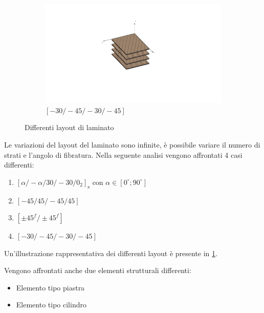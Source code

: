 \documentclass[a4paper,num-refs]{oup-contemporary}
\begin{document}
\begin{figure}[bt!]
\begin{subfigure}[t]{0.24\textwidth}
	\end{subfigure}
	\hfill
	\begin{subfigure}[t]{0.24\textwidth}
		\centering
		\includegraphics[width=\textwidth]{struct4.pdf}
		\caption{$[-30 /-45 /-30 /-45]$}
		
	\end{subfigure}
	\hfill
	\caption{Differenti layout di laminato }
	\label{fig:laminates}
\end{figure}

Le variazioni del layout del laminato sono infinite, è possibile variare il numero di strati e l'angolo di fibratura. Nella seguente analisi vengono affrontati 4 casi differenti:

\begin{enumerate}[label=(\alph*)]
	\item $[\alpha /-\alpha / 30 /-30 / 0_{2}]_{\mathrm{s}}$ con $\alpha\in\left[0^\circ;90^\circ\right]$
	\item $[-45 / 45 /-45 / 45]$
	\item $[\pm 45^{f} / \pm 45^{f}]$
	\item $[-30 /-45 /-30 /-45]$
\end{enumerate}

Un'illustrazione rappresentativa dei differenti layout è presente in \cref{fig:laminates}.

Vengono affrontati anche due elementi strutturali differenti:
\begin{itemize}
\item Elemento tipo piastra
\item Elemento tipo cilindro
\end{itemize}
\end{document}
